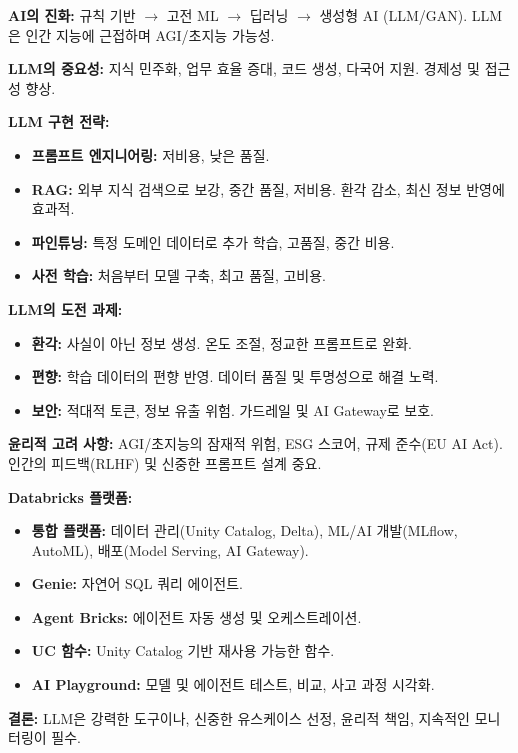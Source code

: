\documentclass[11pt,a4paper]{article}
\begin{document}
\begin{tcolorbox}[summarybox={CSCI103 Lecture 11: LLM 및 에이전트 핵심 요약}]
    \textbf{AI의 진화:} 규칙 기반 $\rightarrow$ 고전 ML $\rightarrow$ 딥러닝 $\rightarrow$ 생성형 AI (LLM/GAN). LLM은 인간 지능에 근접하며 AGI/초지능 가능성.

    \textbf{LLM의 중요성:} 지식 민주화, 업무 효율 증대, 코드 생성, 다국어 지원. 경제성 및 접근성 향상.

    \textbf{LLM 구현 전략:}
    \begin{itemize}
        \item \textbf{프롬프트 엔지니어링:} 저비용, 낮은 품질.
        \item \textbf{RAG:} 외부 지식 검색으로 보강, 중간 품질, 저비용. 환각 감소, 최신 정보 반영에 효과적.
        \item \textbf{파인튜닝:} 특정 도메인 데이터로 추가 학습, 고품질, 중간 비용.
        \item \textbf{사전 학습:} 처음부터 모델 구축, 최고 품질, 고비용.
    \end{itemize}

    \textbf{LLM의 도전 과제:}
    \begin{itemize}
        \item \textbf{환각:} 사실이 아닌 정보 생성. 온도 조절, 정교한 프롬프트로 완화.
        \item \textbf{편향:} 학습 데이터의 편향 반영. 데이터 품질 및 투명성으로 해결 노력.
        \item \textbf{보안:} 적대적 토큰, 정보 유출 위험. 가드레일 및 AI Gateway로 보호.
    \end{itemize}

    \textbf{윤리적 고려 사항:} AGI/초지능의 잠재적 위험, ESG 스코어, 규제 준수(EU AI Act). 인간의 피드백(RLHF) 및 신중한 프롬프트 설계 중요.

    \textbf{Databricks 플랫폼:}
    \begin{itemize}
        \item \textbf{통합 플랫폼:} 데이터 관리(Unity Catalog, Delta), ML/AI 개발(MLflow, AutoML), 배포(Model Serving, AI Gateway).
        \item \textbf{Genie:} 자연어 SQL 쿼리 에이전트.
        \item \textbf{Agent Bricks:} 에이전트 자동 생성 및 오케스트레이션.
        \item \textbf{UC 함수:} Unity Catalog 기반 재사용 가능한 함수.
        \item \textbf{AI Playground:} 모델 및 에이전트 테스트, 비교, 사고 과정 시각화.
    \end{itemize}

    \textbf{결론:} LLM은 강력한 도구이나, 신중한 유스케이스 선정, 윤리적 책임, 지속적인 모니터링이 필수.
\end{tcolorbox}
\end{document}

